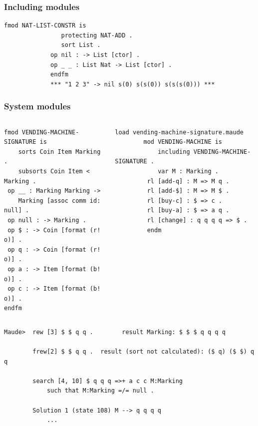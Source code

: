 \documentclass{beamer}
\begin{document}
    \begin{frame}[fragile]
        \frametitle{Including modules}
        \begin{lstlisting}[language=maude]
            fmod NAT-LIST-CONSTR is
                protecting NAT-ADD .
                sort List .
             op nil : -> List [ctor] .
             op _ _ : List Nat -> List [ctor] .
             endfm
             *** "1 2 3" -> nil s(0) s(s(0)) s(s(s(0))) ***
        \end{lstlisting}
        
    \end{frame}


\begin{frame}[fragile]
    \frametitle{System modules}
    \scriptsize
    \begin{columns}
        \begin{column}{.5\textwidth}
            
            \begin{lstlisting}[language=maude]
 fmod VENDING-MACHINE-SIGNATURE is
    sorts Coin Item Marking .
    subsorts Coin Item < Marking .
 op __ : Marking Marking ->
    Marking [assoc comm id: null] .
 op null : -> Marking .
 op $ : -> Coin [format (r! o)] .
 op q : -> Coin [format (r! o)] .
 op a : -> Item [format (b! o)] .
 op c : -> Item [format (b! o)] .
endfm
            \end{lstlisting}
        \end{column}
        \begin{column}{.5\textwidth}
            \begin{lstlisting}[language=maude]
        load vending-machine-signature.maude
        mod VENDING-MACHINE is
            including VENDING-MACHINE-SIGNATURE .
            var M : Marking .
         rl [add-q] : M => M q .
         rl [add-$] : M => M $ .
         rl [buy-c] : $ => c .
         rl [buy-a] : $ => a q .
         rl [change] : q q q q => $ .
         endm
    \end{lstlisting}
        \end{column}
    \end{columns}
   \begin{lstlisting}[language=maude]
Maude>  rew [3] $ $ q q .        result Marking: $ $ $ q q q q
    
        frew[2] $ $ q q .  result (sort not calculated): ($ q) ($ $) q q                 
        
        search [4, 10] $ q q q =>+ a c c M:Marking 
            such that M:Marking =/= null .
        
        Solution 1 (state 108) M --> q q q q 
            ...
    \end{lstlisting} 
\end{frame}
\end{document}
